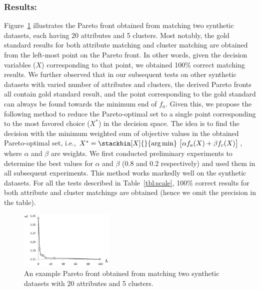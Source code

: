 \subsubsection{Results:}
Figure~\ref{fig:syn_pareto} illustrates the Pareto front obtained from matching two synthetic datasets, each having 20 attributes and 5 clusters. Most notably, the gold standard results for both attribute matching and cluster matching are obtained from the left-most point on the Pareto front. In other words, given the decision variables ($X$) corresponding to that point, we obtained 100\% correct matching results. We further observed that in our subsequent tests on other synthetic datasets with varied number of attributes and clusters, the derived Pareto fronts all contain gold standard result, and the point corresponding to the gold standard can always be found towards the minimum end of $f_a$. Given this, we propose the following method to reduce the Pareto-optimal set to a single point corresponding to the most favored choice ($X^*$) in the decision space. The idea is to find the decision with the minimum weighted sum of objective values in the obtained Pareto-optimal set, i.e., $X^*=\stackbin[X]{}{\argmin}~\big[\alpha f_a(X)+\beta f_c(X)\big]$, where $\alpha$ and $\beta$ are weights. We first conducted preliminary experiments to determine the best values for $\alpha$ and $\beta$ (0.8 and 0.2 respectively) and used them in all subsequent experiments. This method works markedly well on the synthetic datasets. For all the tests described in Table~\ref{tbl:scale}, 100\% correct results for both attribute and cluster matchings are obtained (hence we omit the precision in the table).
\begin{figure}[tb]
\begin{center}
\includegraphics[width=0.4\textwidth]{fig/syn_pareto.eps}
\end{center}
\caption{\label{fig:syn_pareto} An example Pareto front obtained from matching two synthetic datasets with 20 attributes and 5 clusters.}
\end{figure}


